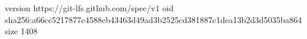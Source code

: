 version https://git-lfs.github.com/spec/v1
oid sha256:a66cc5217877c4588eb43463d49ad3b2525cd381887c1dea13b2d3d5035ba864
size 1408
